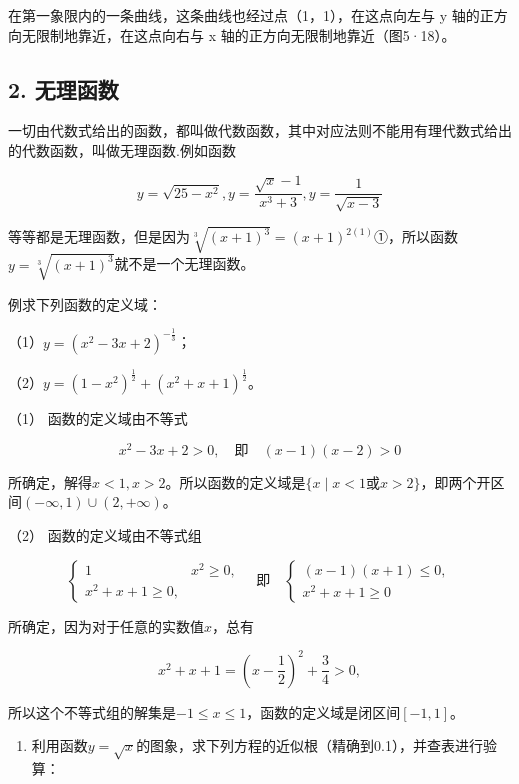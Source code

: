 在第一象限内的一条曲线，这条曲线也经过点（1，1），在这点向左与 y
轴的正方向无限制地靠近，在这点向右与 x 轴的正方向无限制地靠近（图5·18）。

\subsection{2. 无理函数}

一切由代数式给出的函数，都叫做代数函数，其中对应法则不能用有理代数式给出的代数函数，叫做无理函数.例如函数

\[
y = \sqrt{25 - x^{2}}, y = \frac{\sqrt{x} - 1}{x^{3} + 3}, y = \frac{1}{\sqrt{x - 3}}
\]

等等都是无理函数，但是因为\(\sqrt[3]{(x + 1)^3} = (x + 1)^{2(1)}\)①，所以函数\(y = \sqrt[3]{(x + 1)^3}\)就不是一个无理函数。

例求下列函数的定义域：

（1）\(y = (x^2 - 3x + 2)^{-\frac{1}{3}}\)；

（2）\(y = (1 - x^{2})^{\frac{1}{2}} + (x^{2} + x + 1)^{\frac{1}{2}}\)。

 （1） 函数的定义域由不等式

\[
x^{2} - 3 x + 2 > 0, \quad \text{即} \quad (x - 1) (x - 2) > 0
\]

所确定，解得\(x < 1, x > 2\)。所以函数的定义域是\(\{x \mid x < 1\)或\(x > 2\}\)，即两个开区间\((- \infty, 1) \cup (2, +\infty)\)。

（2） 函数的定义域由不等式组

\[
\left\{ \begin{array}{ll} 1 & x^{2} \geqslant 0, \\ x^{2} + x + 1 \geqslant 0, \end{array} \right. \quad \text{即} \quad \left\{ \begin{array}{ll} (x - 1) (x + 1) \leqslant 0, \\ x^{2} + x + 1 \geqslant 0 \end{array} \right.
\]

所确定，因为对于任意的实数值\(x\)，总有

\[
x^{2} + x + 1 = \left(x - \frac{1}{2}\right)^{2} + \frac{3}{4} > 0,
\]

所以这个不等式组的解集是\(-1 \leqslant x \leqslant 1\)，函数的定义域是闭区间\([-1, 1]\)。

\begin{enumerate}
\item
  利用函数\(y = \sqrt{x}\)的图象，求下列方程的近似根（精确到0.1），并查表进行验算：
\end{enumerate}

